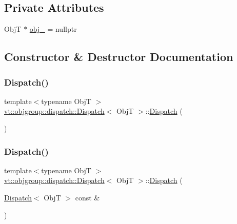 \subsection*{Private Attributes}
\begin{DoxyCompactItemize}
\item 
ObjT $\ast$ \hyperlink{structvt_1_1objgroup_1_1dispatch_1_1_dispatch_af555d34b05bb69173d48b8ece3854414}{obj\+\_\+} = nullptr
\end{DoxyCompactItemize}


\subsection{Constructor \& Destructor Documentation}
\mbox{\label{structvt_1_1objgroup_1_1dispatch_1_1_dispatch_ae4fa82d799ff73006340737e2a4f2c13}} 
\subsubsection{\texorpdfstring{Dispatch()}{Dispatch()}\hspace{0.1cm}{\footnotesize\ttfamily [1/4]}}
{\footnotesize\ttfamily template$<$typename ObjT $>$ \\
\hyperlink{structvt_1_1objgroup_1_1dispatch_1_1_dispatch}{vt\+::objgroup\+::dispatch\+::\+Dispatch}$<$ ObjT $>$\+::\hyperlink{structvt_1_1objgroup_1_1dispatch_1_1_dispatch}{Dispatch} (\begin{DoxyParamCaption}{ }\end{DoxyParamCaption})\hspace{0.3cm}{\ttfamily [delete]}}

\mbox{\label{structvt_1_1objgroup_1_1dispatch_1_1_dispatch_aa36763c5e026720041c4a405a593b9f3}} 
\subsubsection{\texorpdfstring{Dispatch()}{Dispatch()}\hspace{0.1cm}{\footnotesize\ttfamily [2/4]}}
{\footnotesize\ttfamily template$<$typename ObjT $>$ \\
\hyperlink{structvt_1_1objgroup_1_1dispatch_1_1_dispatch}{vt\+::objgroup\+::dispatch\+::\+Dispatch}$<$ ObjT $>$\+::\hyperlink{structvt_1_1objgroup_1_1dispatch_1_1_dispatch}{Dispatch} (\begin{DoxyParamCaption}\item[{\hyperlink{structvt_1_1objgroup_1_1dispatch_1_1_dispatch}{Dispatch}$<$ ObjT $>$ const \&}]{ }\end{DoxyParamCaption})\hspace{0.3cm}{\ttfamily [delete]}}

